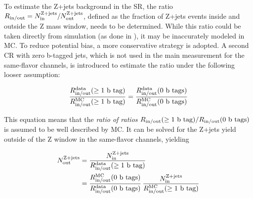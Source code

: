 To estimate the Z+jets background in the SR, the ratio $R_{\mathrm{in/out}} = N_{\mathrm{in}}^{\mathrm{Z+jets}} / N_{\mathrm{out}}^{\mathrm{Z+jets}}$, defined as the fraction of Z+jets events inside and outside the Z mass window, needs to be determined. While this ratio could be taken directly from simulation (as done in ), it may be inaccurately modeled in MC. To reduce potential bias, a more conservative strategy is adopted. A second CR with zero b-tagged jets, which is not used in the main measurement for the same-flavor channels, is introduced to estimate the ratio under the following looser assumption:


\begin{equation}
    \frac{  R_{\mathrm{in/out}}^{\text{data}} ( \geq \text{1 b tag} ) } { R_{\mathrm{in/out}}^{\text{MC}} ( \geq \text{1 b tag} ) } = \frac{  R_{\mathrm{in/out}}^{\text{data}} ( \text{0 b tags} ) } { R_{\mathrm{in/out}}^{\text{MC}} ( \text{0 b tags} ) }
\end{equation}

This equation means that the \textit{ratio of ratios} $R_{\mathrm{in/out}}( \geq \text{1 b tag} ) / R_{\mathrm{in/out}}( \text{0 b tags} )$ is assumed to be well described by MC.
It can be solved for the Z+jets yield outside of the Z window in the same-flavor channels, yielding

\begin{equation}
\begin{split}
    N_{\mathrm{out}}^{\mathrm{Z+jets}} &= \frac {N_{\mathrm{in}}^{\mathrm{Z+jets}}} {R_{\mathrm{in/out}}^{\text{data}} ( \geq \text{1 b tag} )}  \\
    &= \frac{  R_{\mathrm{in/out}}^{\text{MC}} ( \text{0 b tags} ) } { R_{\mathrm{in/out}}^{\text{data}} ( \text{0 b tags} ) } \, \frac {N_{\mathrm{in}}^{\mathrm{Z+jets}}} {R_{\mathrm{in/out}}^{\text{MC}} ( \geq \text{1 b tag} )}
\end{split}
\end{equation}

